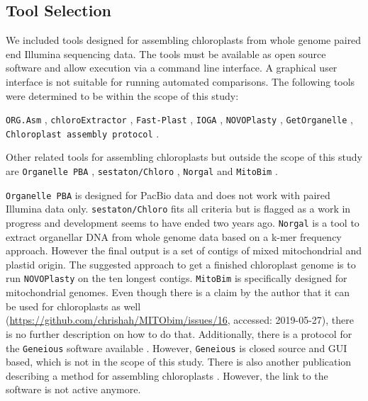 \documentclass{bmcart}
\newcommand{\formatprogramnames}[1]{\texttt{#1}}
\newcommand{\ce}{\formatprogramnames{chloroExtractor}}
\newcommand{\oa}{\formatprogramnames{ORG.Asm}}
\newcommand{\fp}{\formatprogramnames{Fast-Plast}}
\newcommand{\ioga}{\formatprogramnames{IOGA}}
\newcommand{\np}{\formatprogramnames{NOVOPlasty}}
\newcommand{\go}{\formatprogramnames{GetOrganelle}}
\newcommand{\cassp}{\formatprogramnames{Chloroplast assembly protocol}}
\begin{document}
\subsection*{Tool Selection}

We included tools designed for assembling chloroplasts from whole genome paired end Illumina sequencing data. The tools must be available as open source software and allow execution via a command line interface. A graphical user interface is not suitable for
running automated comparisons. The following tools were determined to be within the scope of this study:

\oa{} \cite{coissac_barcodes_2016}, 
\ce{} \cite{j_ankenbrand_chloroextractor:_2018}, 
\fp{} \cite{mckain__fast-plast_2017}, 
\ioga{} \cite{bakker_herbarium_2016}, 
\np{} \cite{dierckxsens_novoplasty:_2017}, 
\go{} \cite{jin_getorganelle:_2018}, 
\cassp{} \cite{sancho_comparative_2018}.

Other related tools for assembling chloroplasts but outside the scope of this study are \texttt{Organelle PBA} \cite{Soorni2017}, \texttt{sestaton/Chloro} \cite{sestaton}, \texttt{Norgal}  \cite{Al-Nakeeb2017} and \texttt{MitoBim} \cite{mitobim2013}.

\texttt{Organelle PBA} is designed for PacBio data and does not work with paired Illumina data only.
\texttt{sestaton/Chloro} fits all criteria but is flagged as a work in progress and development seems to have ended two years ago.
\texttt{Norgal} is a tool to extract organellar DNA from whole genome data based on a k-mer frequency approach. However the final output is a set of contigs of mixed mitochondrial and plastid origin. The suggested approach to get a finished chloroplast genome is to run \np{} on the ten longest contigs.
\texttt{MitoBim} is specifically designed for mitochondrial genomes. Even though there is a claim by the author that it can be used for chloroplasts as well (\url{https://github.com/chrishah/MITObim/issues/16}, accessed: 2019-05-27), there is no further description on how to do that. %
Additionally, there is a protocol for the \texttt{Geneious} \cite{geneious} software available \cite{geneious-protocol}.
However, \texttt{Geneious} is closed source and GUI based, which is not in the scope of this study.
There is also another publication describing a method for assembling chloroplasts \cite{method-description-paper}. However, the link to the software is not active anymore.
\end{document}
